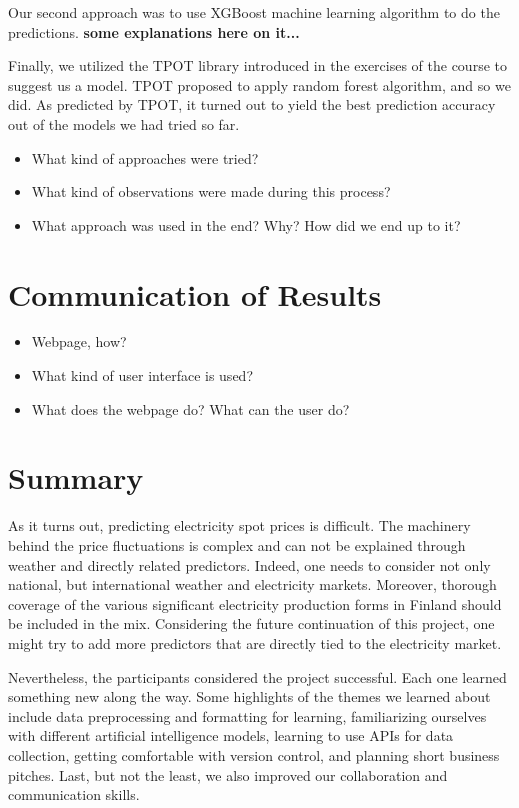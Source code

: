 \documentclass{article}
\numberwithin{equation}{section}
\begin{document}
Our second approach was to use XGBoost machine learning algorithm to do the predictions. \textbf{some explanations here on it...}

Finally, we utilized the TPOT library introduced in the exercises of the course to suggest us a model. TPOT proposed to apply random forest algorithm, and so we did. As predicted by TPOT, it turned out to yield the best prediction accuracy out of the models we had tried so far.

\begin{itemize}
	\item What kind of approaches were tried?
	\item What kind of observations were made during this process?
	\item What approach was used in the end? Why? How did we end up to it?
\end{itemize}

\section{Communication of Results}
\begin{itemize}
	\item Webpage, how?
	\item What kind of user interface is used?
	\item What does the webpage do? What can the user do?
\end{itemize}

\section{Summary}
As it turns out, predicting electricity spot prices is difficult. The machinery behind the price fluctuations is complex and can not be explained through weather and directly related predictors. Indeed, one needs to consider not only national, but international weather and electricity markets. Moreover, thorough coverage of the various significant electricity production forms in Finland should be included in the mix. Considering the future continuation of this project, one might try to add more predictors that are directly tied to the electricity market. 

Nevertheless, the participants considered the project successful. Each one learned something new along the way. Some highlights of the themes we learned about include data preprocessing and formatting for learning, familiarizing ourselves with different artificial intelligence models, learning to use APIs for data collection, getting comfortable with version control, and planning short business pitches. Last, but not the least, we also improved our collaboration and communication skills.

\end{document}
